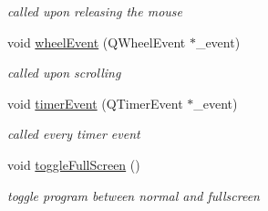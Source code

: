 \begin{DoxyCompactItemize}
\begin{DoxyCompactList}\small\item\em called upon releasing the mouse \end{DoxyCompactList}\item 
void \hyperlink{class_n_g_l_scene_a5ea289b6eb36df76da5e6e39be04c779}{wheel\-Event} (Q\-Wheel\-Event $\ast$\-\_\-event)
\begin{DoxyCompactList}\small\item\em called upon scrolling \end{DoxyCompactList}\item 
void \hyperlink{class_n_g_l_scene_afeb250f7c7b1cac320d06dd14a279cb9}{timer\-Event} (Q\-Timer\-Event $\ast$\-\_\-event)
\begin{DoxyCompactList}\small\item\em called every timer event \end{DoxyCompactList}\item 
\hypertarget{class_n_g_l_scene_ab9cff1e645aa573a5679a55e5c845da8}{void \hyperlink{class_n_g_l_scene_ab9cff1e645aa573a5679a55e5c845da8}{toggle\-Full\-Screen} ()}\label{class_n_g_l_scene_ab9cff1e645aa573a5679a55e5c845da8}

\begin{DoxyCompactList}\small\item\em toggle program between normal and fullscreen \end{DoxyCompactList}\end{DoxyCompactItemize}
